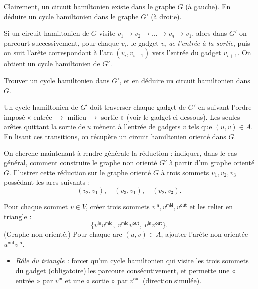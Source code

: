 \begin{exercice}[Le problème \textsc{Cycle Hamiltonien}\footnote{\textit{Source :} \url{https://www.youtube.com/watch?v=kl2k_wgYYic}.}]
  \begin{question}
  \item Clairement, un circuit hamiltonien existe dans le graphe $G$ (à gauche).  
    En déduire un cycle hamiltonien dans le graphe $G'$ (à droite).
  \end{question}
  \begin{correction}
    Si un circuit hamiltonien de $G$ visite $v_1 \to v_2 \to \dots \to v_n \to v_1$, alors dans $G'$ on parcourt successivement,
    pour chaque $v_i$, le gadget $v_i$ \emph{de l'entrée à la sortie}, puis on suit l'arête correspondant à l'arc $(v_i,v_{i+1})$
    vers l'entrée du gadget $v_{i+1}$. On obtient un cycle hamiltonien de $G'$.
  \end{correction}

  \begin{question}
  \item Trouver un cycle hamiltonien dans $G'$, et en déduire un circuit hamiltonien dans $G$.
  \end{question}
  \begin{correction}
    Un cycle hamiltonien de $G'$ doit traverser chaque gadget de $G'$ en suivant
    l'ordre imposé « entrée $\to$ milieu $\to$ sortie » (voir le gadget ci-dessous).
    Les seules arêtes quittant la sortie de $u$ mènent à l'entrée de gadgets $v$ tels que $(u,v)\in A$.
    En lisant ces transitions, on récupère un circuit hamiltonien orienté dans $G$.
  \end{correction}

  \begin{question}
  \item On cherche maintenant à rendre générale la réduction : indiquer, dans le cas général, comment construire le graphe non orienté $G'$ à partir d'un graphe orienté $G$.  
    Illustrer cette réduction sur le graphe orienté $G$ à trois sommets $v_1, v_2, v_3$ possédant les arcs suivants :
    $$(v_2, v_1),\quad (v_3, v_1),\quad (v_2, v_3).$$
  \end{question}
  \begin{correction}
    Pour chaque sommet $v\in V$, créer trois sommets $v^{\mathsf{in}}, v^{\mathsf{mid}}, v^{\mathsf{out}}$ et les relier en triangle :
    \[
    \{v^{\mathsf{in}}v^{\mathsf{mid}},\ v^{\mathsf{mid}}v^{\mathsf{out}},\ v^{\mathsf{in}}v^{\mathsf{out}}\}.
    \]
    (Graphe non orienté.)  
    Pour chaque arc $(u,v)\in A$, ajouter l'arête non orientée $u^{\mathsf{out}}v^{\mathsf{in}}$.
    \begin{itemize}
    \item \emph{Rôle du triangle :} forcer qu'un cycle hamiltonien qui visite les trois sommets du gadget (obligatoire) les parcoure consécutivement, et permette une « entrée » par $v^{\mathsf{in}}$ et une « sortie » par $v^{\mathsf{out}}$ (direction simulée).
    \end{itemize}


\end{correction}
\end{exercice}
